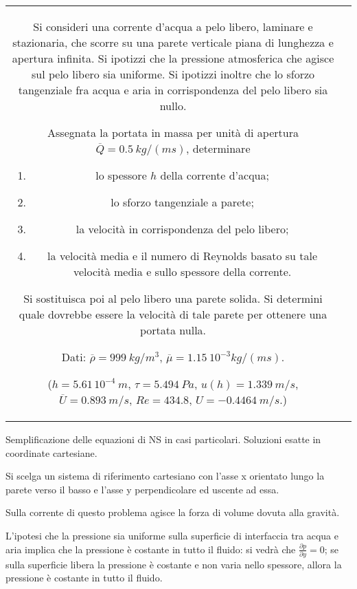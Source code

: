 \noindent
\begin{tabular}{cc}
\begin{minipage}[b]{0.95\textwidth}
\begin{exerciseS}
Si consideri una corrente d'acqua a pelo libero, laminare e stazionaria, che
scorre su una parete verticale piana di lunghezza e apertura infinita.
Si ipotizzi che la pressione atmosferica che agisce sul pelo libero sia
uniforme. Si ipotizzi inoltre che lo sforzo tangenziale fra acqua e aria in
corrispondenza del pelo libero sia nullo.

Assegnata la portata in massa per unit\`a di apertura 
$\overline{Q}=0.5\ kg/(ms)$, determinare
\begin{enumerate}
  \item lo spessore $h$ della corrente d'acqua;
  \item lo sforzo tangenziale a parete;
  \item la velocit\`a in corrispondenza del pelo libero;
  \item la velocit\`a media e il numero di Reynolds basato su tale velocit\`a
        media e sullo spessore della corrente.
\end{enumerate}
Si sostituisca poi al pelo libero una parete solida.
Si determini quale dovrebbe essere la velocit\`a di tale parete per ottenere
una portata nulla.

Dati: $\overline{\rho}= 999\ kg/m^3$, 
$\overline{\mu}= 1.15\ 10^{-3} kg/(ms)$.

($h=5.61\, 10^{-4}\  m$, $\tau = 5.494\ Pa$, $u(h)=1.339\ m/s$,
$\overline{U}=0.893\  m/s$, $ Re=434.8$, $U=-0.4464\ m/s$.)
\end{exerciseS}
\end{minipage}
\end{tabular}

\sol

\partone
 Semplificazione delle equazioni di NS in casi particolari. 
Soluzioni esatte in coordinate cartesiane.

\parttwo
Si scelga un sistema di riferimento cartesiano con l'asse x orientato lungo la parete verso il basso e l'asse y perpendicolare ed uscente ad essa.

\noindent
Sulla corrente di questo problema agisce la forza di volume dovuta alla gravità.  

L'ipotesi che la pressione sia uniforme sulla superficie di interfaccia
 tra acqua e aria implica che la pressione è costante in tutto il fluido:
 si vedrà che $\frac{\partial p}{\partial y}=0$; se sulla superficie libera
 la pressione è costante e non varia nello spessore, allora la pressione
 è costante in tutto il fluido.

